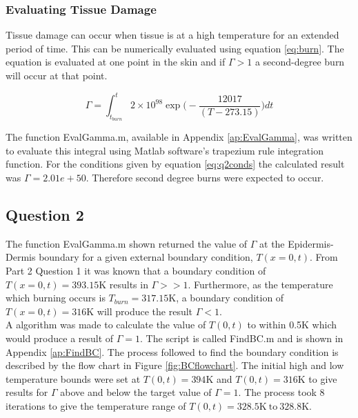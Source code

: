 \documentclass[11pt]{article}
\begin{document}
\FloatBarrier




\subsubsection{Evaluating Tissue Damage}

Tissue damage can occur when tissue is at a high temperature for an extended period of time. This can be numerically evaluated using equation \ref{eq:burn}. The equation is evaluated at one point in the skin and if $\Gamma > 1$ a second-degree burn will occur at that point. 

\begin{equation} \label{eq:burn}
\Gamma = \int^{t}_{t_{burn}} 2 \times 10^{98} \exp{\bigg(- \frac{12017}{(T - 273.15)}\bigg)} dt
\end{equation}

The function EvalGamma.m, available in Appendix \ref{ap:EvalGamma}, was written to evaluate this integral using Matlab software's trapezium rule integration function. For the conditions given by equation \eqref{eq:q2conds} the calculated result was $\Gamma = 2.01e+50$. Therefore second degree burns were expected to occur. 

\clearpage
\FloatBarrier
\subsection{Question 2}


The function EvalGamma.m shown returned the value of $\Gamma$ at the Epidermis-Dermis boundary for a given external boundary condition, $T(x=0, t) $. From Part 2 Question 1 it was known that a boundary condition of $T(x=0, t) = 393.15$K results in   $\Gamma >> 1$. Furthermore, as the temperature which burning occurs is $T_{burn} = 317.15$K, a boundary condition of $T(x=0, t) = 316$K will produce the result  $\Gamma < 1$. \\



A algorithm was made to calculate the value of $T(0,t)$ to within 0.5K which would produce a result of $\Gamma = 1$. The script is called FindBC.m and is shown in Appendix \ref{ap:FindBC}. The process followed to find the boundary condition is described by the flow chart in Figure \ref{fig:BCflowchart}. The initial high and low temperature bounds were set at $T(0, t) = 394$K and $T(0, t) = 316$K to give results for $\Gamma$ above and below the target value of $\Gamma = 1$. The process took 8 iterations to give the temperature range of $T(0,t) = 328.5\text{K} \ \text{to} \ 328.8$K. \\
\end{document}
